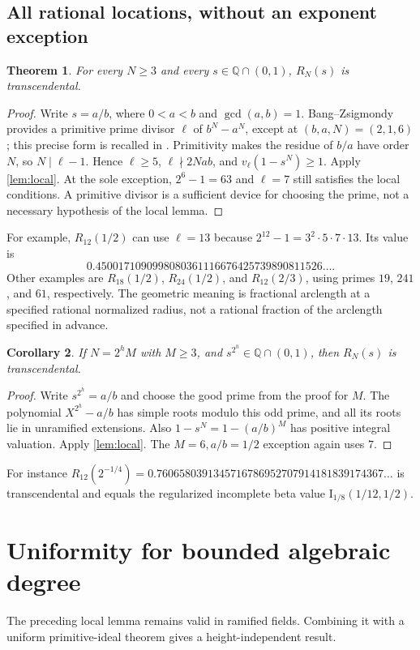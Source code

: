 \documentclass[11pt,a4paper]{article}
\numberwithin{equation}{section}
\newtheorem{theorem}{Theorem}[section]
\newtheorem{corollary}[theorem]{Corollary}
\theoremstyle{definition}
\theoremstyle{remark}
\newcommand{\Q}{\mathbb Q}
\begin{document}
\subsection{All rational locations, without an exponent exception}
\begin{theorem}\label{thm:rational-input}
For every $N\ge3$ and every $s\in\Q\cap(0,1)$, $R_N(s)$ is
transcendental.
\end{theorem}
\begin{proof}
Write $s=a/b$, where $0<a<b$ and $\gcd(a,b)=1$. Bang--Zsigmondy provides
a primitive prime divisor $\ell$ of $b^N-a^N$, except at
$(b,a,N)=(2,1,6)$; this precise form is recalled in \cite{Avci}.
Primitivity makes the residue of $b/a$ have order $N$, so
$N\mid\ell-1$. Hence $\ell\ge5$, $\ell\nmid2Nab$, and
$v_\ell(1-s^N)\ge1$. Apply \cref{lem:local}.
At the sole exception, $2^6-1=63$ and $\ell=7$ still satisfies the local
conditions. A primitive divisor is a sufficient device for choosing the
prime, not a necessary hypothesis of the local lemma.
\end{proof}

For example, $R_{12}(1/2)$ can use $\ell=13$ because
$2^{12}-1=3^2\cdot5\cdot7\cdot13$. Its value is
\[
 0.4500171090998080361116676425739890811526\ldots.
\]
Other examples are $R_{18}(1/2)$, $R_{24}(1/2)$, and $R_{12}(2/3)$,
using primes $19$, $241$, and $61$, respectively. The geometric meaning is
fractional arclength at a specified rational normalized radius, not a
rational fraction of the arclength specified in advance.

\begin{corollary}
If $N=2^hM$ with $M\ge3$, and $s^{2^h}\in\Q\cap(0,1)$, then
$R_N(s)$ is transcendental.
\end{corollary}
\begin{proof}
Write $s^{2^h}=a/b$ and choose the good prime from the proof for $M$.
The polynomial $X^{2^h}-a/b$ has simple roots modulo this odd prime, and
all its roots lie in unramified extensions. Also
$1-s^N=1-(a/b)^M$ has positive integral valuation. Apply
\cref{lem:local}. The $M=6,a/b=1/2$ exception again uses $7$.
\end{proof}
For instance $R_{12}(2^{-1/4})=0.7606580391345716786952707914181839174367
\ldots$ is transcendental and equals the regularized incomplete beta value
$\mathrm I_{1/8}(1/12,1/2)$.

\section{Uniformity for bounded algebraic degree}\label{sec:bounded}
The preceding local lemma remains valid in ramified fields. Combining it
with a uniform primitive-ideal theorem gives a height-independent result.
\end{document}
